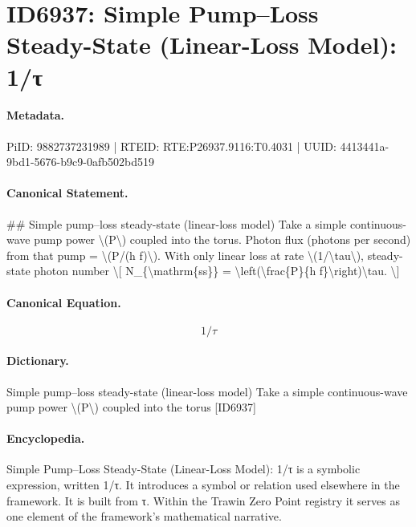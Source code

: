 \section*{ID6937: Simple Pump–Loss Steady-State (Linear-Loss Model): 1/τ}
\paragraph{Metadata.}
PiID: 9882737231989 | RTEID: RTE:P26937.9116:T0.4031 | UUID: 4413441a-9bd1-5676-b9c9-0afb502bd519

\paragraph{Canonical Statement.}
\#\# Simple pump–loss steady-state (linear-loss model) Take a simple continuous-wave pump power \textbackslash{}(P\textbackslash{}) coupled into the torus. Photon flux (photons per second) from that pump = \textbackslash{}(P/(h f)\textbackslash{}). With only linear loss at rate \textbackslash{}(1/\textbackslash{}tau\textbackslash{}), steady-state photon number \textbackslash{}[ N\_\{\textbackslash{}mathrm\{ss\}\} = \textbackslash{}left(\textbackslash{}frac\{P\}\{h f\}\textbackslash{}right)\textbackslash{}tau. \textbackslash{}]

\paragraph{Canonical Equation.}
\[
1/\tau
\]

\paragraph{Dictionary.}
Simple pump–loss steady-state (linear-loss model) Take a simple continuous-wave pump power \textbackslash{}(P\textbackslash{}) coupled into the torus [ID6937]

\paragraph{Encyclopedia.}
Simple Pump–Loss Steady-State (Linear-Loss Model): 1/τ is a symbolic expression, written 1/τ. It introduces a symbol or relation used elsewhere in the framework. It is built from τ. Within the Trawin Zero Point registry it serves as one element of the framework's mathematical narrative.
